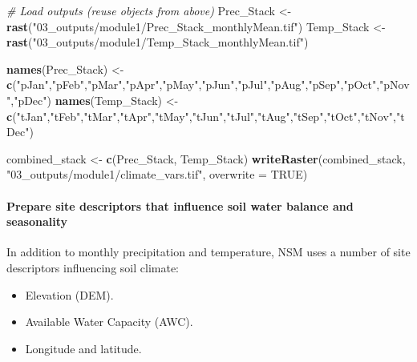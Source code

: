 \documentclass[
  10pt,
  b5paper,
  oneside]{book}
\newenvironment{Shaded}{\begin{snugshade}}{\end{snugshade}}
\newcommand{\AttributeTok}[1]{\textcolor[rgb]{0.13,0.29,0.53}{#1}}
\newcommand{\CommentTok}[1]{\textcolor[rgb]{0.56,0.35,0.01}{\textit{#1}}}
\newcommand{\ConstantTok}[1]{\textcolor[rgb]{0.56,0.35,0.01}{#1}}
\newcommand{\FunctionTok}[1]{\textcolor[rgb]{0.13,0.29,0.53}{\textbf{#1}}}
\newcommand{\NormalTok}[1]{#1}
\newcommand{\OtherTok}[1]{\textcolor[rgb]{0.56,0.35,0.01}{#1}}
\newcommand{\StringTok}[1]{\textcolor[rgb]{0.31,0.60,0.02}{#1}}
\begin{document}
\begin{Shaded}
\begin{Highlighting}[]
\CommentTok{\# Load outputs (reuse objects from above)}
\NormalTok{Prec\_Stack }\OtherTok{\textless{}{-}} \FunctionTok{rast}\NormalTok{(}\StringTok{"03\_outputs/module1/Prec\_Stack\_monthlyMean.tif"}\NormalTok{)}
\NormalTok{Temp\_Stack }\OtherTok{\textless{}{-}} \FunctionTok{rast}\NormalTok{(}\StringTok{"03\_outputs/module1/Temp\_Stack\_monthlyMean.tif"}\NormalTok{)}


\FunctionTok{names}\NormalTok{(Prec\_Stack) }\OtherTok{\textless{}{-}} \FunctionTok{c}\NormalTok{(}\StringTok{"pJan"}\NormalTok{,}\StringTok{"pFeb"}\NormalTok{,}\StringTok{"pMar"}\NormalTok{,}\StringTok{"pApr"}\NormalTok{,}\StringTok{"pMay"}\NormalTok{,}\StringTok{"pJun"}\NormalTok{,}\StringTok{"pJul"}\NormalTok{,}\StringTok{"pAug"}\NormalTok{,}\StringTok{"pSep"}\NormalTok{,}\StringTok{"pOct"}\NormalTok{,}\StringTok{"pNov"}\NormalTok{,}\StringTok{"pDec"}\NormalTok{)}
\FunctionTok{names}\NormalTok{(Temp\_Stack) }\OtherTok{\textless{}{-}} \FunctionTok{c}\NormalTok{(}\StringTok{"tJan"}\NormalTok{,}\StringTok{"tFeb"}\NormalTok{,}\StringTok{"tMar"}\NormalTok{,}\StringTok{"tApr"}\NormalTok{,}\StringTok{"tMay"}\NormalTok{,}\StringTok{"tJun"}\NormalTok{,}\StringTok{"tJul"}\NormalTok{,}\StringTok{"tAug"}\NormalTok{,}\StringTok{"tSep"}\NormalTok{,}\StringTok{"tOct"}\NormalTok{,}\StringTok{"tNov"}\NormalTok{,}\StringTok{"tDec"}\NormalTok{)}

\NormalTok{combined\_stack }\OtherTok{\textless{}{-}} \FunctionTok{c}\NormalTok{(Prec\_Stack, Temp\_Stack)}
\FunctionTok{writeRaster}\NormalTok{(combined\_stack, }\StringTok{"03\_outputs/module1/climate\_vars.tif"}\NormalTok{, }\AttributeTok{overwrite =} \ConstantTok{TRUE}\NormalTok{)}
\end{Highlighting}
\end{Shaded}

\paragraph*{Prepare site descriptors that influence soil water balance and seasonality}\label{prepare-site-descriptors-that-influence-soil-water-balance-and-seasonality}

In addition to monthly precipitation and temperature, NSM uses a number of site descriptors influencing soil climate:

\begin{itemize}
\item
  Elevation (DEM).
\item
  Available Water Capacity (AWC).
\item
  Longitude and latitude.
\end{itemize}
\end{document}
